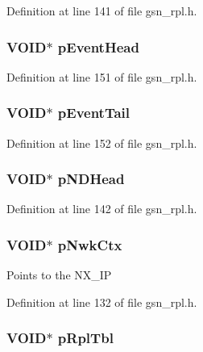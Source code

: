 Definition at line 141 of file gsn\_\-rpl.h.

\hypertarget{a00192_a47ec1a774c77852d6a1072e13766b36c}{
\subsubsection[{pEventHead}]{\setlength{\rightskip}{0pt plus 5cm}VOID$\ast$ {\bf pEventHead}}}
\label{a00192_a47ec1a774c77852d6a1072e13766b36c}


Definition at line 151 of file gsn\_\-rpl.h.

\hypertarget{a00192_a4c9c903e4b7f0f16aabfb6607702e294}{
\subsubsection[{pEventTail}]{\setlength{\rightskip}{0pt plus 5cm}VOID$\ast$ {\bf pEventTail}}}
\label{a00192_a4c9c903e4b7f0f16aabfb6607702e294}


Definition at line 152 of file gsn\_\-rpl.h.

\hypertarget{a00192_a25d31e9fd9b291f73cce2b8172dc2aef}{
\subsubsection[{pNDHead}]{\setlength{\rightskip}{0pt plus 5cm}VOID$\ast$ {\bf pNDHead}}}
\label{a00192_a25d31e9fd9b291f73cce2b8172dc2aef}


Definition at line 142 of file gsn\_\-rpl.h.

\hypertarget{a00192_a61296c752ce7703e4fd3a188b913e15f}{
\subsubsection[{pNwkCtx}]{\setlength{\rightskip}{0pt plus 5cm}VOID$\ast$ {\bf pNwkCtx}}}
\label{a00192_a61296c752ce7703e4fd3a188b913e15f}
Points to the NX\_\-IP 

Definition at line 132 of file gsn\_\-rpl.h.

\hypertarget{a00192_a3113ce3fa4fc63f204aa2d6902088a66}{
\subsubsection[{pRplTbl}]{\setlength{\rightskip}{0pt plus 5cm}VOID$\ast$ {\bf pRplTbl}}}
\label{a00192_a3113ce3fa4fc63f204aa2d6902088a66}


